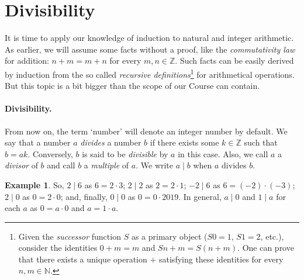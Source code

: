 \documentclass[12pt,notitlepage]{article}
\theoremstyle{plain}
\theoremstyle{definition}
\newtheorem{exm}[thm]{Example}
\theoremstyle{plain}
\newcommand{\N}{\mathbb{N}}
\newcommand{\Z}{\mathbb{Z}}
\newcommand{\1}{\mathbf{1}}
\newcommand{\0}{\mathbf{0}}
\newcommand{\dvd}{\mathop{\mid}}
\newcommand{\mcomm}[1]{}
\begin{document}
\section{Divisibility}
\mcomm{This section opens a series of classical results on integer arithmetic. We looked upon them as a playground for the students to try induction principles in solving concrete problems  and, of course, to have some rest before coming back to more abstract concepts.}

It is time to apply our knowledge of induction to natural and integer arithmetic. As earlier, we will assume some facts without a proof, like the \emph{commutativity law} for addition: $n + m = m + n$ for every $m, n \in \Z$. Such facts can be easily derived by induction from the so called \emph{recursive definitions}\footnote{Given the \emph{successor} function $S$ as a primary object ($S 0 = 1$, $S 1 = 2$, etc.), consider the identities $0 + m = m$ and $S n + m = S(n + m)$. One can prove that there exists a unique operation ${+}$ satisfying these identities for every $n, m  \in \N$.} for arithmetical operations. But this topic is a bit bigger than the scope of our Course can contain.

\paragraph{Divisibility.} From now on, the term `number' will denote an integer number by default. We say that a number $a$ \emph{divides} a number $b$ if there exists some $k \in \Z$ such that $b = ak$. Conversely, $b$ is said to be \emph{divisible} by $a$ in this case. Also, we call $a$ a \emph{divisor} of $b$ and call $b$ a \emph{multiple} of $a$. We write $a \dvd b$ when $a$ divides $b$.

\mcomm{Most students feel quite uncomfortable with the fact that $0$ divides $0$. They tend to ignore the \emph{definition} in favor of \emph{connotations}: ``as it is not possible to \emph{divide by} zero, zero cannot \emph{divide} anything''. Of course, it is a general problem of mathematical education that the students just do not \emph{read} what is written.  The Instructor should use such examples to demonstrate the importance of clear and, perhaps, \emph{slow} reading in mathematics (likewise the latter is important in philology, according to Nietzsche's famous maxim).}
\begin{exm}
So, $2 \dvd 6$ as $6 = 2 \cdot 3$; $2 \dvd 2$ as $2 = 2 \cdot 1$; $-2 \dvd 6$ as $6 = (-2) \cdot (-3)$; $2 \dvd 0$ as $0 = 2 \cdot 0$; and, finally, $0 \dvd 0$ as $0 = 0 \cdot 2019$. In general, $a \dvd 0$  and $1 \dvd a$ for each $a$ as $0 = a \cdot 0$ and $a = 1 \cdot a$.
\end{exm}
\end{document}
